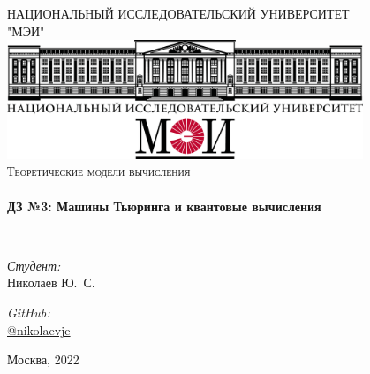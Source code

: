 \begin{titlepage}
\begin{center}



\textsc{\Large НАЦИОНАЛЬНЫЙ ИССЛЕДОВАТЕЛЬСКИЙ УНИВЕРСИТЕТ}\\
\textsc{\Large "МЭИ"}\\[1cm]

\includegraphics[width=0.8\textwidth]{img/logo.png}~\\[1cm]

\textsc{\Large Теоретические модели вычисления}\\[0.5cm]

\HRule \\[0.4cm]
{ \LARGE \bfseries ДЗ №3: Машины Тьюринга и квантовые вычисления \\[0.4cm] }

\HRule \\[1.5cm]

\noindent
\begin{minipage}{0.4\textwidth}
\begin{flushleft} \large
\emph{Студент:}\\
Николаев \textsc{Ю.~С.}
\end{flushleft}
\end{minipage}%
\begin{minipage}{0.4\textwidth}
\begin{flushright} \large
\emph{GitHub:} \\
\href{https://github.com/NRU-MPEI-IMAI/tm-and-qc-nikolaevje}{@nikolaevje}
\end{flushright}
\end{minipage}

\vfill

{\large Москва, 2022}

\end{center}
\end{titlepage}